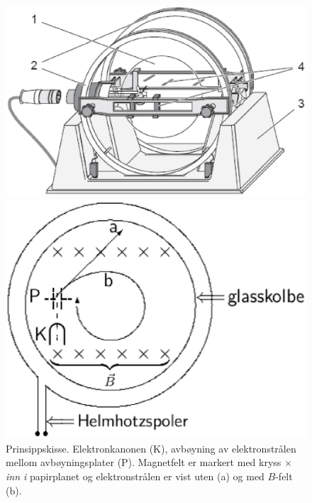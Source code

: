 \documentclass[../Elmag-labhefte-2020.tex]{subfiles}
\begin{document}
\begin{figure}[ht]
\RawFloats
    \begin{minipage}[b]{0.45\linewidth}
        \centering
        \includegraphics[scale=0.525]{fig/FineBeamApparat.eps}
        \caption{%
            Leybold apparat med elektronkanonen innen glasskolbe (1), 
            Helmholtzspoler (2), 
            holder (3), 
            og radiusmåler (4).
        }
        \label{lorentz.fig4}
        \vspace{0.5cm}
    \end{minipage}
    \hspace{1cm}
    \begin{minipage}[b]{0.5\linewidth}
        \centering
        \includegraphics[scale=0.525]{fig/Schematic.eps}
        \caption{%
            Prinsippskisse. 
            Elektronkanonen (K), 
            avbøyning av elektronstrålen mellom avbøyningsplater (P). 
            Magnetfelt er markert med kryss $\times$ \textsl{inn i} papirplanet og elektronstrålen er vist uten (a) og med $B$-felt (b). }
        \label{lorentz.fig5}
    \end{minipage}
\end{figure}
\end{document}
